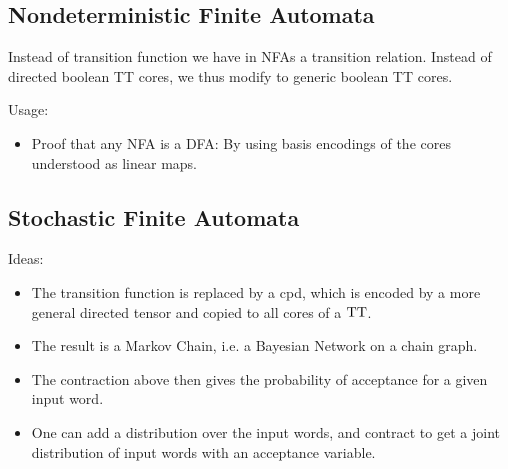 \subsection{Nondeterministic Finite Automata}

Instead of transition function we have in NFAs a transition relation.
Instead of directed boolean TT cores, we thus modify to generic boolean TT cores.

Usage:
\begin{itemize}
    \item Proof that any NFA is a DFA: By using basis encodings of the cores understood as linear maps.
\end{itemize}

\subsection{Stochastic Finite Automata}

Ideas:
\begin{itemize}
    \item The transition function is replaced by a cpd, which is encoded by a more general directed tensor and copied to all cores of a $\mathrm{TT}$.
    \item The result is a Markov Chain, i.e. a Bayesian Network on a chain graph.
    \item The contraction above then gives the probability of acceptance for a given input word.
    \item One can add a distribution over the input words, and contract to get a joint distribution of input words with an acceptance variable.
\end{itemize}
